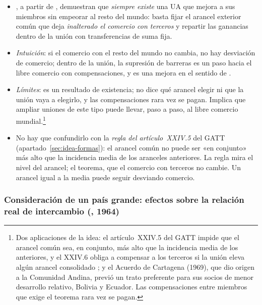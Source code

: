 \documentclass[11pt]{article}
\begin{document}
\begin{itemize}
\item \textcite{KempWan1976Elementary}, a partir de \textcite{Ohyama1972}, demuestran que \emph{siempre existe} una UA que mejora a sus miembros sin empeorar al resto del mundo: basta fijar el arancel exterior común que deja \emph{inalterado el comercio con terceros} y repartir las ganancias dentro de la unión con transferencias de suma fija.
\item \emph{Intuición}: si el comercio con el resto del mundo no cambia, no hay desviación de comercio; dentro de la unión, la supresión de barreras es un paso hacia el libre comercio con compensaciones, y es una mejora en el sentido de .
\item \emph{Límites}: es un resultado de existencia; no dice qué arancel elegir ni que la unión vaya a elegirlo, y las compensaciones rara vez se pagan\nocite{Bhagwati1991World}. Implica que ampliar uniones de este tipo puede llevar, paso a paso, al libre comercio mundial.\footnote{Dos aplicaciones de la idea: el artículo~XXIV.5 del GATT impide que el arancel común sea, en conjunto, más alto que la incidencia media de los anteriores, y el XXIV.6 obliga a compensar a los terceros si la unión eleva algún arancel consolidado\nocite{GATT1947} ; y el Acuerdo de Cartagena (1969), que dio origen a la Comunidad Andina, previó un trato preferente para sus socios de menor desarrollo relativo, Bolivia y Ecuador. Las compensaciones entre miembros que exige el teorema rara vez se pagan\nocite{Bhagwati1991World}.}
\item No hay que confundirlo con la \emph{regla del artículo~XXIV.5} del GATT (apartado~\ref{sec:idea-formas}): el arancel común no puede ser «en conjunto» más alto que la incidencia media de los aranceles anteriores. La regla mira el nivel del arancel; el teorema, que el comercio con terceros no cambie. Un arancel igual a la media puede seguir desviando comercio.
\end{itemize}

\subsubsection{Consideración de un país grande: efectos sobre la relación real de intercambio (, 1964)}\label{sec:pais-grande}
\end{document}
